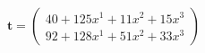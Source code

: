 \documentclass[preview]{standalone}
\begin{document}
\begin{align*}
\mathbf{t} = \begin{pmatrix}40 + 125x^{1} + 11x^{2} + 15x^{3} \\ 92 + 128x^{1} + 51x^{2} + 33x^{3}\end{pmatrix}
\end{align*}
\end{document}
